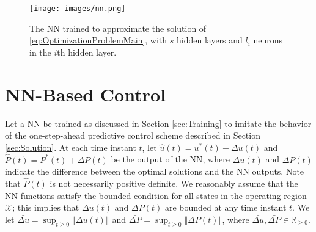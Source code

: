 \documentclass[1p,times]{elsarticle}
\begin{document}
\begin{figure}[!h]
    \centering
    \texttt{[image: images/nn.png]}
    \caption{{{\color{blue}}The NN trained to approximate the solution of \eqref{eq:OptimizationProblemMain}, with $s$ hidden layers and $l_i$ neurons in the $i$th hidden layer.}}
    \label{fig:nn}
\end{figure}

















\section{NN-Based Control}\label{sec:NNControl}
Let a NN be trained as discussed in Section \ref{sec:Training} to imitate the behavior of the one-step-ahead predictive control scheme described in Section \ref{sec:Solution}. At each time instant $t$, let $\hat{u}(t)=u^\ast(t)+\Delta u(t)$ and $\hat{P}(t)=P^\ast(t)+\Delta P(t)$ be the output of the NN, where $\Delta u(t)$ and $\Delta P(t)$ indicate the difference between the optimal solutions and the NN outputs. Note that $\hat{P}(t)$ is not necessarily positive definite. We reasonably assume that \cite{dai2021lyapunov} the NN functions satisfy the bounded condition for all states in the operating region $\mathcal{X}$; this implies that $\Delta u(t)$ and $\Delta P(t)$ are bounded at any time instant $t$. We let $\bar{\Delta u}=\sup_{t\geq0}\left\Vert\Delta u(t)\right\Vert$ and $\bar{\Delta P}=\sup_{t\geq0}\left\Vert\Delta P(t)\right\Vert$, where $\bar{\Delta u},\bar{\Delta P}\in\mathbb{R}_{\geq0}$.
\end{document}
